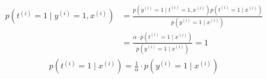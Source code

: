 \begin{answer}
\begin{align*}
p(t^{(i)}=1\mid y^{(i)} = 1, x^{(i)})&=\frac{p(y^{(i)} = 1\mid t^{(i)}=1, x^{(i)})p(t^{(i)}=1\mid x^{(i)})}{p(y^{(i)} = 1\mid x^{(i)})}\\
&=\frac{\alpha\cdot p(t^{(i)}=1\mid x^{(i)})}{p(y^{(i)} = 1\mid x^{(i)})}=1
\end{align*}
\begin{align*}
p(t^{(i)}=1\mid x^{(i)})=\frac{1}{\alpha}\cdot p(y^{(i)} = 1\mid x^{(i)})
\end{align*}
\end{answer}
